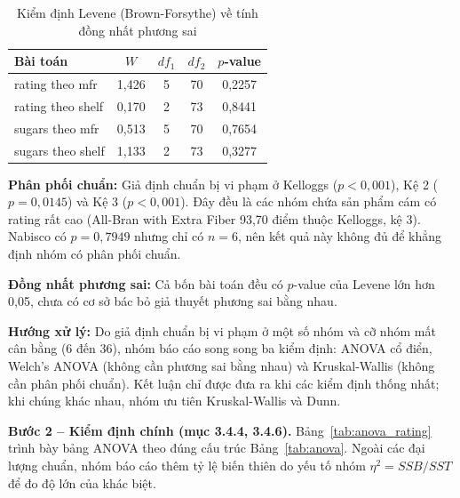 \documentclass[12pt,a4paper]{article}
\begin{document}
\begin{table}[H]
\centering
\caption{Kiểm định Levene (Brown-Forsythe) về tính đồng nhất phương sai}
\label{tab:levene}
\begin{tabular}{l c c c c}
\toprule
Bài toán & $W$ & $df_1$ & $df_2$ & $p$-value \\
\midrule
rating theo mfr   & 1,426 & 5 & 70 & 0,2257 \\
rating theo shelf & 0,170 & 2 & 73 & 0,8441 \\
sugars theo mfr   & 0,513 & 5 & 70 & 0,7654 \\
sugars theo shelf & 1,133 & 2 & 73 & 0,3277 \\
\bottomrule
\end{tabular}
\end{table}

\textbf{Phân phối chuẩn:} Giả định chuẩn bị vi phạm ở Kelloggs ($p < 0{,}001$), Kệ 2
($p = 0{,}0145$) và Kệ 3 ($p < 0{,}001$). Đây đều là các nhóm chứa sản phẩm cám có rating rất
cao (All-Bran with Extra Fiber 93,70 điểm thuộc Kelloggs, kệ 3). Nabisco có $p = 0{,}7949$
nhưng chỉ có $n = 6$, nên kết quả này không đủ để khẳng định nhóm có phân phối chuẩn.

\textbf{Đồng nhất phương sai:} Cả bốn bài toán đều có $p$-value của Levene lớn hơn 0,05,
chưa có cơ sở bác bỏ giả thuyết phương sai bằng nhau.

\textbf{Hướng xử lý:} Do giả định chuẩn bị vi phạm ở một số nhóm và cỡ nhóm mất cân bằng
(6 đến 36), nhóm báo cáo song song ba kiểm định: ANOVA cổ điển, Welch's ANOVA (không cần
phương sai bằng nhau) và Kruskal-Wallis (không cần phân phối chuẩn). Kết luận chỉ được đưa ra
khi các kiểm định thống nhất; khi chúng khác nhau, nhóm ưu tiên Kruskal-Wallis và Dunn.

\textbf{Bước 2 -- Kiểm định chính (mục 3.4.4, 3.4.6).} Bảng~\ref{tab:anova_rating} trình bày
bảng ANOVA theo đúng cấu trúc Bảng~\ref{tab:anova}. Ngoài các đại lượng chuẩn, nhóm báo cáo thêm
tỷ lệ biến thiên do yếu tố nhóm $\eta^2 = SSB/SST$ để đo độ lớn của khác biệt.
\end{document}
